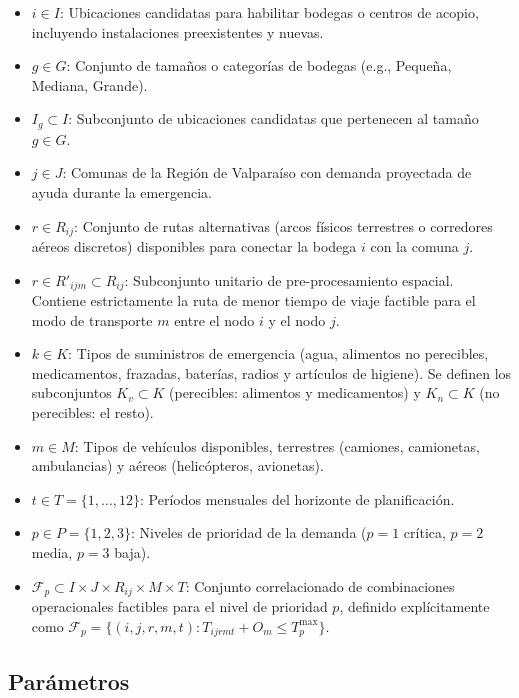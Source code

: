 \documentclass[letterpaper]{article}
\begin{document}
\begin{flushleft}
\begin{itemize}[leftmargin=2em, itemsep=1pt]
  \item $i \in I$: Ubicaciones candidatas para habilitar bodegas o centros de acopio, incluyendo instalaciones preexistentes y nuevas.
  \item $g \in G$: Conjunto de tama\~nos o categor\'ias de bodegas (e.g., Peque\~na, Mediana, Grande).
  \item $I_g \subset I$: Subconjunto de ubicaciones candidatas que pertenecen al tama\~no $g \in G$.
  \item $j \in J$: Comunas de la Regi\'on de Valpara\'iso con demanda proyectada de ayuda durante la emergencia.
  \item $r \in R_{ij}$: Conjunto de rutas alternativas (arcos f\'isicos terrestres o corredores a\'ereos discretos) disponibles para conectar la bodega $i$ con la comuna $j$.
  \item $r \in R'_{ijm} \subset R_{ij}$: Subconjunto unitario de pre-procesamiento espacial. Contiene estrictamente la ruta de menor tiempo de viaje factible para el modo de transporte $m$ entre el nodo $i$ y el nodo $j$.
  \item $k \in K$: Tipos de suministros de emergencia (agua, alimentos no perecibles, medicamentos, frazadas, bater\'ias, radios y art\'iculos de higiene). Se definen los subconjuntos $K_v \subset K$ (perecibles: alimentos y medicamentos) y $K_n \subset K$ (no perecibles: el resto).
  \item $m \in M$: Tipos de veh\'iculos disponibles, terrestres (camiones, camionetas, ambulancias) y a\'ereos (helic\'opteros, avionetas).
  \item $t \in T = \{1,\dots,12\}$: Per\'iodos mensuales del horizonte de planificaci\'on.
  \item $p \in P = \{1,2,3\}$: Niveles de prioridad de la demanda ($p=1$ cr\'itica, $p=2$ media, $p=3$ baja).
  \item $\mathcal{F}_p \subset I \times J \times R_{ij} \times M \times T$: Conjunto correlacionado de combinaciones operacionales factibles para el nivel de prioridad $p$, definido expl\'icitamente como $\mathcal{F}_p = \{(i,j,r,m,t) : T_{ijrmt} + O_m \leq T^{\max}_p\}$.
\end{itemize}

\subsection{Par\'ametros}


\end{flushleft}
\end{document}

